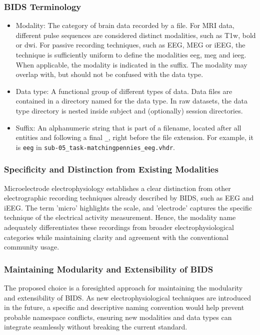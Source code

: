 \documentclass[fleqn,10pt]{wlscirep}
\begin{document}
\subsubsection*{BIDS Terminology}
\begin{itemize}
    \item Modality: The category of brain data recorded by a file. For MRI data, different pulse sequences are considered distinct modalities, such as T1w, bold or dwi. For passive recording techniques, such as EEG, MEG or iEEG, the technique is sufficiently uniform to define the modalities eeg, meg and ieeg. When applicable, the modality is indicated in the suffix. The modality may overlap with, but should not be confused with the data type.
    \item Data type: A functional group of different types of data. Data files are contained in a directory named for the data type. In raw datasets, the data type directory is nested inside subject and (optionally) session directories.
    \item Suffix: An alphanumeric string that is part of a filename, located after all entities and following a final \texttt{\_}, right before the file extension. For example, it is \texttt{eeg} in \texttt{sub-05\_task-matchingpennies\_eeg.vhdr}.
\end{itemize}

\subsubsection*{Specificity and Distinction from Existing Modalities}
Microelectrode electrophysiology establishes a clear distinction from other electrographic recording techniques already described by BIDS, such as EEG and iEEG. The term 'micro' highlights the scale, and 'electrode' captures the specific technique of the electrical activity measurement. Hence, the modality name adequately differentiates these recordings from broader electrophysiological categories while maintaining clarity and agreement with the conventional community usage.

\subsubsection*{Maintaining Modularity and Extensibility of BIDS}
The proposed choice is a foresighted approach for maintaining the modularity and extensibility of BIDS. As new electrophysiological techniques are introduced in the future, a specific and descriptive naming convention would help prevent probable namespace conflicts, ensuring new modalities and data types can integrate seamlessly without breaking the current standard.
\end{document}
